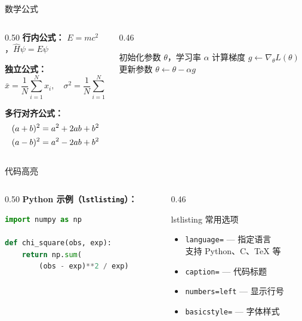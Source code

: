 \documentclass[aspectratio=169]{beamer}
\def\env#1{\texttt{\color{blue}\footnotesize #1}}
\begin{document}
\begin{frame}{数学公式}
\begin{columns}[T]
\begin{column}{0.50\textwidth}
\textbf{行内公式：} $E = mc^2$，$\hat{H}\psi = E\psi$
\medskip

\textbf{独立公式：}
\[
\bar{x} = \frac{1}{N}\sum_{i=1}^{N} x_i,\quad
\sigma^2 = \frac{1}{N}\sum_{i=1}^{N}(x_i - \bar{x})^2
\]

\textbf{多行对齐公式：}
\begin{align}
(a+b)^2 &= a^2 + 2ab + b^2 \notag\\
(a-b)^2 &= a^2 - 2ab + b^2 \notag
\end{align}
\end{column}
\begin{column}{0.46\textwidth}
\begin{algorithm}[H]
\caption{梯度下降法}
\begin{algorithmic}[1]
\STATE 初始化参数 $\theta$，学习率 $\alpha$
    \STATE 计算梯度 $g \leftarrow \nabla_\theta L(\theta)$
    \STATE 更新参数 $\theta \leftarrow \theta - \alpha g$
\ENDWHILE
\end{algorithmic}
\end{algorithm}
\end{column}
\end{columns}
\end{frame}

\begin{frame}[fragile]{代码高亮}
\begin{columns}[T]
\begin{column}{0.50\textwidth}
\textbf{Python 示例（\env{lstlisting}）：}
\begin{lstlisting}[language=Python, caption=卡方统计量]
import numpy as np

def chi_square(obs, exp):
    return np.sum(
        (obs - exp)**2 / exp)
\end{lstlisting}
\end{column}
\begin{column}{0.46\textwidth}
\begin{aim*}{lstlisting 常用选项}{}
\begin{itemize}[left=0pt,label=\textcolor{deepblue}{}]
    \item \texttt{language=} — 指定语言\\
    支持 Python、C、TeX 等
    \item \texttt{caption=} — 代码标题
    \item \texttt{numbers=left} — 显示行号
    \item \texttt{basicstyle=} — 字体样式
\end{itemize}
\end{aim*}
\end{column}
\end{columns}
\end{frame}
\end{document}
